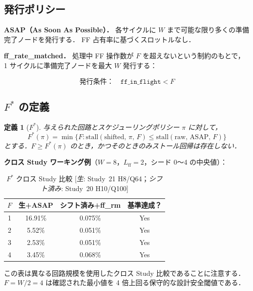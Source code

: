 \documentclass[journal,10pt,twocolumn]{IEEEtran}
\newtheorem{definition}{定義}
\begin{document}
\subsection{発行ポリシー}

\textbf{ASAP（As Soon As Possible）．}
各サイクルに $W$ まで可能な限り多くの準備完了ノードを発行する．
FF 占有率に基づくスロットルなし．

\textbf{ff\_rate\_matched．}
処理中 FF 操作数が $F$ を超えないという制約のもとで，
1 サイクルに準備完了ノードを最大 $W$ 発行する：

\begin{equation}
  \text{発行条件：}\quad \texttt{ff\_in\_flight} < F
\end{equation}

\subsection{$F^*$ の定義}

\begin{definition}[$F^*$]
与えられた回路とスケジューリングポリシー $\pi$ に対して，
\begin{equation}
  F^*(\pi) = \min\bigl\{F :
    \mathrm{stall}(\text{shifted},\, \pi,\, F) \leq
    \mathrm{stall}(\text{raw},\, \mathrm{ASAP},\, F)\bigr\}
\end{equation}
とする．$F \geq F^*(\pi)$ のとき，かつそのときのみストール回帰は存在しない．
\end{definition}

\textbf{クロス Study ワーキング例}（$W=8$，$L_{\mathrm{ff}}=2$，シード 0〜4 の中央値）：

\begin{table}[h]
\centering
\caption{$F^*$ クロス Study 比較
  [\textit{生}: Study~21 H8/Q64；\textit{シフト済み}: Study~20 H10/Q100]}
\label{tab:fstar-crossstudy}
\begin{tabular}{cccc}
\toprule
$F$ & 生+ASAP & シフト済み+ff\_rm & 基準達成？ \\
\midrule
1 & 16.91\% & 0.075\% & Yes \\
2 &  5.52\% & 0.051\% & Yes \\
3 &  2.53\% & 0.051\% & Yes \\
4 &  3.45\% & 0.068\% & Yes \\
\bottomrule
\end{tabular}
\end{table}

この表は異なる回路規模を使用したクロス Study 比較であることに注意する．
$F = W/2 = 4$ は確認された最小値を 4 倍上回る保守的な設計安全閾値である．
\end{document}
